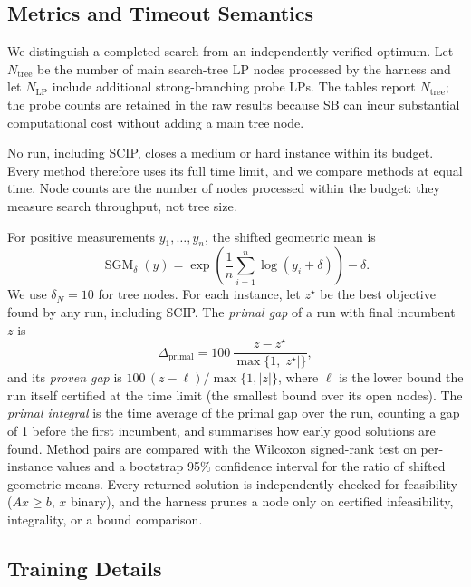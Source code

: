 \documentclass[11pt,a4paper]{article}
\newcommand{\SGM}{\operatorname{SGM}}
\begin{document}
\subsection{Metrics and Timeout Semantics}

We distinguish a completed search from an independently verified optimum. Let $N_{\mathrm{tree}}$ be the number of main search-tree LP nodes processed by the harness and let $N_{\mathrm{LP}}$ include additional strong-branching probe LPs. The tables report $N_{\mathrm{tree}}$; the probe counts are retained in the raw results because SB can incur substantial computational cost without adding a main tree node.

No run, including SCIP, closes a medium or hard instance within its budget. Every method therefore uses its full time limit, and we compare methods at equal time. Node counts are the number of nodes processed within the budget: they measure search throughput, not tree size.

For positive measurements $y_1,\ldots,y_n$, the shifted geometric mean is
\begin{equation}
  \SGM_\delta(y)=
  \exp\!\left(\frac1n\sum_{i=1}^{n}\log(y_i+\delta)\right)-\delta .
  \label{eq:sgm}
\end{equation}
We use $\delta_N=10$ for tree nodes. For each instance, let $z^\star$ be the best objective found by any run, including SCIP. The \emph{primal gap} of a run with final incumbent $z$ is
\begin{equation}
  \Delta_{\mathrm{primal}}=
  100\,
  \frac{z-z^\star}{\max\{1,|z^\star|\}},
  \label{eq:primal-gap}
\end{equation}
and its \emph{proven gap} is $100\,(z-\ell)/\max\{1,|z|\}$, where $\ell$ is the lower bound the run itself certified at the time limit (the smallest bound over its open nodes). The \emph{primal integral} is the time average of the primal gap over the run, counting a gap of 1 before the first incumbent, and summarises how early good solutions are found. Method pairs are compared with the Wilcoxon signed-rank test on per-instance values and a bootstrap 95\% confidence interval for the ratio of shifted geometric means. Every returned solution is independently checked for feasibility ($Ax\ge b$, $x$ binary), and the harness prunes a node only on certified infeasibility, integrality, or a bound comparison.


\subsection{Training Details}
\label{sec:training}
\end{document}
